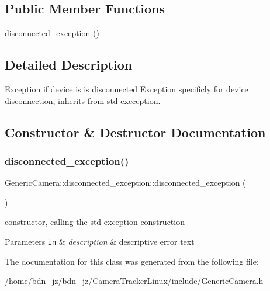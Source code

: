 \subsection*{Public Member Functions}
\begin{DoxyCompactItemize}
\item 
\hyperlink{class_generic_camera_1_1disconnected__exception_ac3e9d17d6848faa8bf458c19ebe21812}{disconnected\+\_\+exception} ()
\end{DoxyCompactItemize}


\subsection{Detailed Description}
Exception if device is is disconnected Exception specificly for device disconnection, inherits from std exeception. 

\subsection{Constructor \& Destructor Documentation}
\mbox{\label{class_generic_camera_1_1disconnected__exception_ac3e9d17d6848faa8bf458c19ebe21812}} 
\subsubsection{\texorpdfstring{disconnected\+\_\+exception()}{disconnected\_exception()}}
{\footnotesize\ttfamily Generic\+Camera\+::disconnected\+\_\+exception\+::disconnected\+\_\+exception (\begin{DoxyParamCaption}{ }\end{DoxyParamCaption})\hspace{0.3cm}{\ttfamily [inline]}}

constructor, calling the std exception construction 
\begin{DoxyParams}[1]{Parameters}
\mbox{\tt in}  & {\em description} & descriptive error text \\
\hline
\end{DoxyParams}


The documentation for this class was generated from the following file\+:\begin{DoxyCompactItemize}
\item 
/home/bdn\+\_\+jz/bdn\+\_\+jz/\+Camera\+Tracker\+Linux/include/\hyperlink{_generic_camera_8h}{Generic\+Camera.\+h}\end{DoxyCompactItemize}
